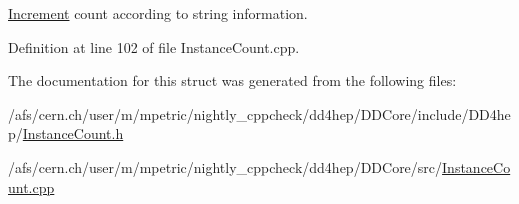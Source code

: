 \hyperlink{struct_d_d4hep_1_1_increment}{Increment} count according to string information. 



Definition at line 102 of file Instance\+Count.\+cpp.



The documentation for this struct was generated from the following files\+:\begin{DoxyCompactItemize}
\item 
/afs/cern.\+ch/user/m/mpetric/nightly\+\_\+cppcheck/dd4hep/\+D\+D\+Core/include/\+D\+D4hep/\hyperlink{_instance_count_8h}{Instance\+Count.\+h}\item 
/afs/cern.\+ch/user/m/mpetric/nightly\+\_\+cppcheck/dd4hep/\+D\+D\+Core/src/\hyperlink{_instance_count_8cpp}{Instance\+Count.\+cpp}\end{DoxyCompactItemize}

